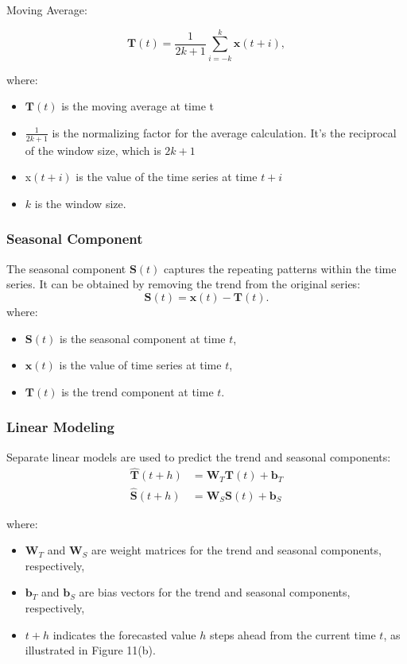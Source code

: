 \documentclass{ieeeojies}
\begin{document}
Moving Average:

\begin{equation}
    \mathbf{T}(t) = \frac{1}{2k+1} \sum_{i=-k}^{k} \mathbf{x}(t+i),
\end{equation}

where:
\begin{itemize}
    \item $\mathbf{T}(t)$ is the moving average at time t
    \item $\frac{1}{2k+1}$ is the normalizing factor for the average calculation. It's the reciprocal of the window size, which is $2k+1$
    \item x$(t+i)$ is the value of the time series at time $t+i$
    \item $k$ is the window size.
\end{itemize}


\subsubsection{Seasonal Component}
The seasonal component $\mathbf{S}(t)$ captures the repeating patterns within the time series. It can be obtained by removing the trend from the original series:
\begin{equation}
    \mathbf{S}(t) = \mathbf{x}(t) - \mathbf{T}(t).
\end{equation}
where:
\begin{itemize}
    \item $\mathbf{S}(t)$ is the seasonal component at time $t$,
    \item $\mathbf{x}(t)$ is the value of time series at time $t$,
    \item $\mathbf{T}(t)$ is the trend component at time $t$.
\end{itemize}

\subsubsection{Linear Modeling}
Separate linear models are used to predict the trend and seasonal components:
\begin{align}
    \hat{\mathbf{T}}(t+h) & = \mathbf{W}_T \mathbf{T}(t) + \mathbf{b}_T \\
    \hat{\mathbf{S}}(t+h) & = \mathbf{W}_S \mathbf{S}(t) + \mathbf{b}_S
\end{align}

where:
\begin{itemize}
    \item $\mathbf{W}_T$ and $\mathbf{W}_S$ are weight matrices for the trend and seasonal components, respectively,
    \item $\mathbf{b}_T$ and $\mathbf{b}_S$ are bias vectors for the trend and seasonal components, respectively,
    \item $t+h$ indicates the forecasted value $h$ steps ahead from the current time $t$, as illustrated in Figure 11(b).
\end{itemize}
\end{document}
